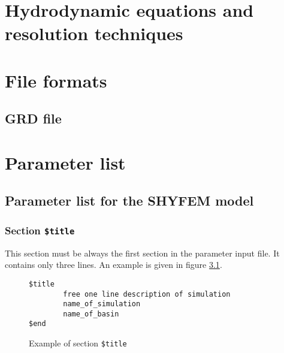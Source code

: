 \documentclass{report}
\begin{document}
\appendix


\chapter{Hydrodynamic equations and resolution techniques}

	

\chapter{File formats}
\label{file_formats}


	\section{GRD file}
	







\chapter{Parameter list}


\section{Parameter list for the SHYFEM model}


\subsection{Section {\tt \$title}}

This section must be always the first section in the parameter input file.
It contains only three lines. An example is given in 
figure \ref{fig:titleexample}.

\begin{figure}[ht]
\begin{verbatim}
$title
        free one line description of simulation
        name_of_simulation
        name_of_basin
$end
\end{verbatim}
\caption{Example of section {\tt \$title}}
\label{fig:titleexample}
\end{figure}
\end{document}
